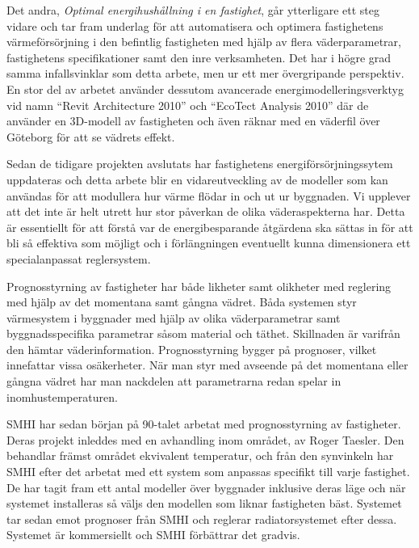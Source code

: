 Det andra, \textit{Optimal energihushållning i en fastighet}\cite{kandidatarbete2010},
går ytterligare ett steg vidare och tar fram underlag för att automatisera och
optimera fastighetens värmeförsörjning i den befintlig fastigheten med hjälp av
flera väderparametrar, fastighetens specifikationer samt den inre verksamheten. Det har i högre grad samma infallsvinklar som detta arbete, men ur ett mer övergripande perspektiv. En stor del av arbetet använder dessutom avancerade energimodelleringsverktyg vid namn ``Revit Architecture 2010'' och 
``EcoTect Analysis 2010'' där de använder en 3D-modell av fastigheten och även
räknar med en väderfil över Göteborg för att se vädrets effekt.

Sedan de tidigare projekten avslutats har fastighetens energiförsörjningssytem uppdateras och detta arbete blir en vidareutveckling av de modeller som kan användas för att modullera hur värme flödar in och ut ur byggnaden. Vi upplever att det inte är helt utrett hur stor påverkan de olika väderaspekterna har. Detta är essentiellt för att förstå var de energibesparande åtgärdena ska sättas in för att bli så effektiva som möjligt och i förlängningen eventuellt kunna dimensionera ett specialanpassat reglersystem.

Prognosstyrning av fastigheter har både likheter samt olikheter med reglering med hjälp av det momentana samt gångna vädret. Båda systemen styr värmesystem i byggnader med hjälp av olika väderparametrar samt byggnadsspecifika parametrar såsom material och täthet. Skillnaden är varifrån den hämtar väderinformation. Prognosstyrning bygger på prognoser, vilket innefattar vissa osäkerheter. När man styr med avseende på det momentana eller gångna vädret har man nackdelen att parametrarna redan spelar in inomhustemperaturen.

SMHI har sedan början på 90-talet arbetat med prognosstyrning av fastigheter. Deras projekt inleddes med en avhandling inom området, av Roger Taesler. Den behandlar främst området ekvivalent temperatur, och från den synvinkeln har SMHI efter det arbetat med ett system som anpassas specifikt till varje fastighet. De har tagit fram ett antal modeller över byggnader inklusive deras läge och när systemet installeras så väljs den modellen som liknar fastigheten bäst. Systemet tar sedan emot prognoser från SMHI och reglerar radiatorsystemet efter dessa. Systemet är kommersiellt och SMHI förbättrar det gradvis.






